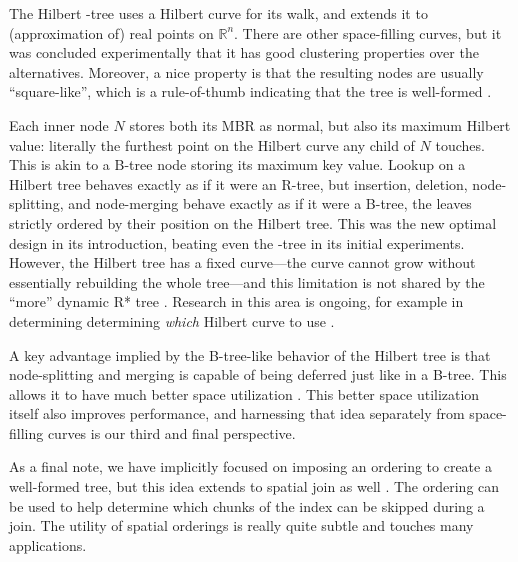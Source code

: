 The Hilbert \rbase-tree uses a Hilbert curve for its walk, and extends it to (approximation of) real points on $\mathbb R^n$.
There are other space-filling curves, but it was concluded experimentally that it has good clustering properties \cite{kamelfaloutsos94} over the alternatives.
Moreover, a nice property is that the resulting nodes are usually ``square-like'', which is a rule-of-thumb indicating that the tree is well-formed \cite{kamelfaloutsos94,theodoridissellis96}.

Each inner node $N$ stores both its MBR as normal, but also its maximum Hilbert value: literally the furthest point on the Hilbert curve any child of $N$ touches.
This is akin to a B-tree node storing its maximum key value.
Lookup on a Hilbert tree behaves exactly as if it were an R-tree, but insertion, deletion, node-splitting, and node-merging behave exactly as if it were a B-tree, the leaves strictly ordered by their position on the Hilbert tree.
This was the new optimal design in its introduction, beating even the \rstar-tree in its initial experiments.
However, the Hilbert tree has a fixed curve---the curve cannot grow without essentially rebuilding the whole tree---and this limitation is not shared by the ``more'' dynamic R* tree \cite{beckmannseeger09}.
Research in this area is ongoing, for example in determining determining \emph{which} Hilbert curve to use \cite{haverkortwalderveen11}.

A key advantage implied by the B-tree-like behavior of the Hilbert tree is that node-splitting and merging is capable of being deferred just like in a B-tree.
This allows it to have much better space utilization \cite{kamelfaloutsos94}.
This better space utilization itself also improves performance, and harnessing that idea separately from space-filling curves is our third and final perspective.

As a final note, we have implicitly focused on imposing an ordering to create a well-formed tree, but this idea extends to spatial join as well \cite{jacoxsamet07,orenstein86}.
The ordering can be used to help determine which chunks of the index can be skipped during a join.
The utility of spatial orderings is really quite subtle and touches many applications.

